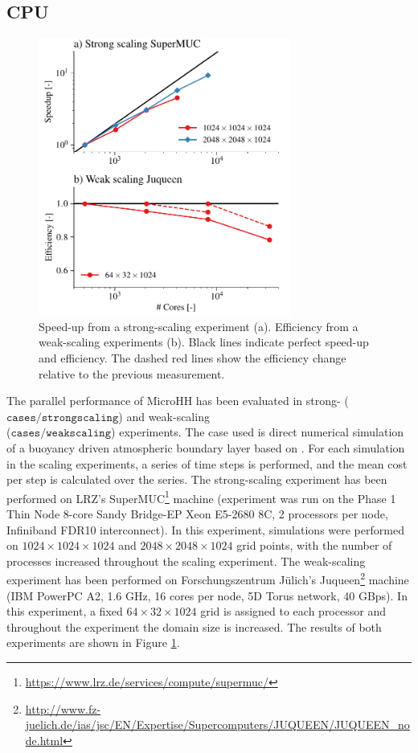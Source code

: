 \documentclass[gmd,manuscript]{copernicus}
\begin{document}
\subsection{CPU}
\begin{figure}[!hbt]
	\vspace*{2mm}
	\begin{center}
		\includegraphics[width=8.3cm]{figs/scaling.pdf}
	\end{center}
	\caption{Speed-up from a strong-scaling experiment (a). Efficiency from a weak-scaling experiments (b). Black lines indicate perfect speed-up and efficiency. The dashed red lines show the efficiency change relative to the previous measurement.}\label{fig:scaling}
\end{figure}
The parallel performance of MicroHH has been evaluated in strong- ($\texttt{cases/strongscaling}$) and weak-scaling\\ ($\texttt{cases/weakscaling}$) experiments. The case used is direct numerical simulation of a buoyancy driven atmospheric boundary layer based on \citet{vanHeerwaarden2014}. For each simulation in the scaling experiments, a series of time steps is performed, and the mean cost per step is calculated over the series. The strong-scaling experiment has been performed on LRZ's SuperMUC\footnote{\url{https://www.lrz.de/services/compute/supermuc/}} machine (experiment was run on the Phase 1 Thin Node 8-core Sandy Bridge-EP Xeon E5-2680 8C, 2 processors per node, Infiniband FDR10 interconnect). In this experiment, simulations were performed on $1024 \times 1024 \times 1024$ and $2048 \times 2048 \times 1024$ grid points, with the number of processes increased throughout the scaling experiment. The weak-scaling experiment has been performed on Forschungszentrum J\"{u}lich's Juqueen\footnote{\url{http://www.fz-juelich.de/ias/jsc/EN/Expertise/Supercomputers/JUQUEEN/JUQUEEN_node.html}} machine (IBM PowerPC A2, 1.6 GHz, 16 cores per node, 5D Torus network, 40 GBps). In this experiment, a fixed $64 \times 32 \times 1024$ grid is assigned to each processor and throughout the experiment the domain size is increased. The results of both experiments are shown in Figure \ref{fig:scaling}.
\end{document}

